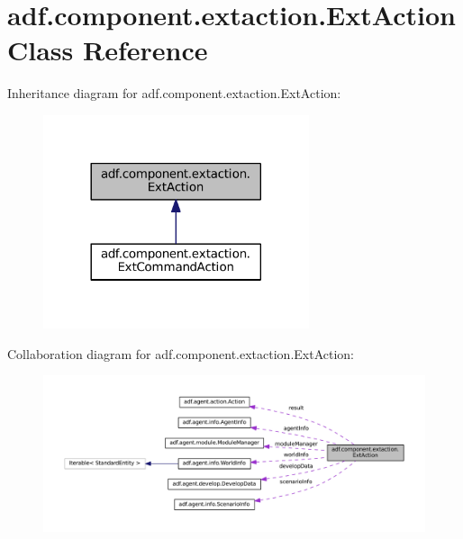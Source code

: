 \hypertarget{classadf_1_1component_1_1extaction_1_1ExtAction}{}\section{adf.\+component.\+extaction.\+Ext\+Action Class Reference}
\label{classadf_1_1component_1_1extaction_1_1ExtAction}


Inheritance diagram for adf.\+component.\+extaction.\+Ext\+Action\+:
\nopagebreak
\begin{figure}[H]
\begin{center}
\leavevmode
\includegraphics[width=221pt]{classadf_1_1component_1_1extaction_1_1ExtAction__inherit__graph}
\end{center}
\end{figure}


Collaboration diagram for adf.\+component.\+extaction.\+Ext\+Action\+:
\nopagebreak
\begin{figure}[H]
\begin{center}
\leavevmode
\includegraphics[width=350pt]{classadf_1_1component_1_1extaction_1_1ExtAction__coll__graph}
\end{center}
\end{figure}
